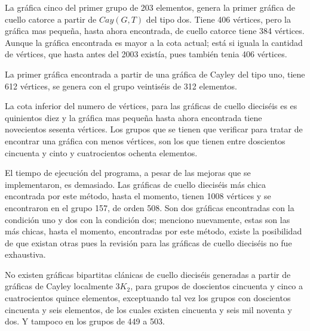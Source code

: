 \documentclass[12pt]{book}
\theoremstyle{definition}
\begin{document}
La gráfica cinco del primer grupo de 203 elementos, genera
la primer gráfica de cuello catorce a partir de $Cay(G,T)$ del tipo
dos. Tiene 406  vértices, pero la gráfica mas pequeña,
hasta ahora encontrada, de cuello catorce tiene 384  vértices. Aunque la gráfica encontrada es mayor a la cota
actual; est\'a si iguala la cantidad de vértices, que hasta antes del
2003 existía, pues también tenia 406 vértices.

La primer gráfica encontrada a partir de una gráfica de Cayley del
tipo uno, tiene 612 vértices, se genera con el grupo
veintiséis de 312 elementos.

La cota inferior del numero de vértices, para las gráficas de cuello
dieciséis es es quinientos diez y la gráfica mas pequeña hasta ahora
encontrada tiene novecientos sesenta vértices. Los grupos que se
tienen que verificar para tratar de encontrar una gráfica con menos
vértices, son los que tienen entre doscientos cincuenta y cinto y
cuatrocientos ochenta elementos.


El tiempo de ejecución del programa, a pesar de las mejoras que se
implementaron, es demasiado. Las gráficas de cuello dieciséis m\'as
chica encontrada por este método, hasta el momento, tienen 1008
vértices y se encontraron en el grupo 157, de orden 508. Son dos
gráficas encontradas con la condición uno y dos con la condición dos;
menciono nuevamente, estas son las m\'as chicas, hasta el momento,
encontradas por este método, existe la posibilidad de que existan
otras pues la revisión para las gráficas de cuello dieciséis no fue
exhaustiva.


No existen gráficas bipartitas clánicas de cuello dieciséis generadas
a partir de gráficas de Cayley localmente $3K_2$, para grupos de
doscientos cincuenta y cinco a cuatrocientos quince elementos,
exceptuando tal vez los grupos con doscientos cincuenta y seis
elementos, de los cuales existen cincuenta y seis mil noventa y dos. Y
tampoco en los grupos de 449 a 503.






\printindex
\end{document}
